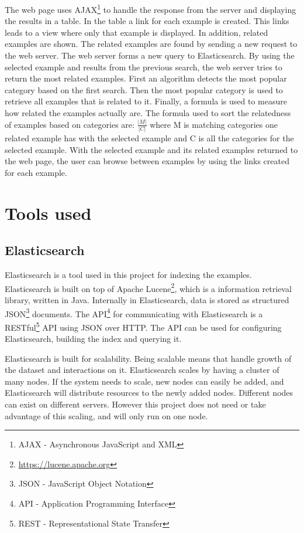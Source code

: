 The web page uses AJAX\footnote{AJAX - Asynchronous JavaScript and XML} to handle the response from the server and displaying the results in a table. In the table a link for each example is created. This links leads to a view where only that example is displayed. In addition, related examples are shown. The related examples are found by sending a new request to the web server. The web server forms a new query to Elasticsearch. By using the selected example and results from the previous search, the web server tries to return the most related examples. First an algorithm detects the most popular category based on the first search. Then the most popular category is used to retrieve all examples that is related to it. Finally, a formula is used to measure how related the examples actually are. The formula used to sort the relatedness of examples based on categories are: \(\frac{|M|}{|C|}\) where M is matching categories one related example has with the selected example and C is all the categories for the selected example.
With the selected example and its related examples returned to the web page, the user can browse between examples by using the links created for each example.

\section{Tools used}

\subsection{Elasticsearch} \label{elasticsearch}

Elasticsearch is a tool used in this project for indexing the examples. Elasticsearch is built on top of Apache Lucene\footnote{\url{https://lucene.apache.org}}, which is a information retrieval library, written in Java. Internally in Elasticsearch, data is stored as structured JSON\footnote{JSON - JavaScript Object Notation} documents. The API\footnote{API - Application Programming Interface} for communicating with Elasticsearch is a RESTful\footnote{REST - Representational State Transfer} API using JSON over HTTP. The API can be used for configuring Elasticsearch, building the index and querying it. 

Elasticsearch is built for scalability. Being scalable means that handle growth of the dataset and interactions on it. Elasticsearch scales by having a cluster of many nodes. If the system needs to scale, new nodes can easily be added, and Elasticsearch will distribute resources to the newly added nodes. Different nodes can exist on different servers. However this project does not need or take advantage of this scaling, and will only run on one node.

